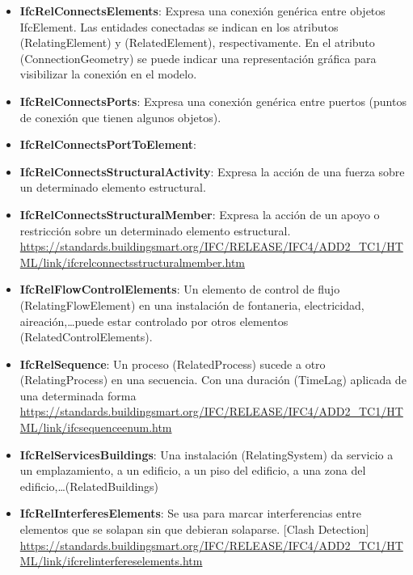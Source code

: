 \documentclass[spanish,12pt,a4paper,final,oneside]{book}
\begin{document}
\begin{itemize}
\item \textbf{IfcRelConnectsElements}: Expresa una conexión genérica entre objetos IfcElement. Las entidades conectadas se indican en los atributos (RelatingElement) y (RelatedElement), respectivamente. En el atributo (ConnectionGeometry) se puede indicar una representación gráfica para visibilizar la conexión en el modelo.

\item \textbf{IfcRelConnectsPorts}: Expresa una conexión genérica entre puertos (puntos de conexión que tienen algunos objetos).

\item \textbf{IfcRelConnectsPortToElement}:

\item \textbf{IfcRelConnectsStructuralActivity}: Expresa la acción de una fuerza sobre un determinado elemento estructural.

\item \textbf{IfcRelConnectsStructuralMember}: Expresa la acción de un apoyo o restricción sobre un determinado elemento estructural.
\\ \url{https://standards.buildingsmart.org/IFC/RELEASE/IFC4/ADD2_TC1/HTML/link/ifcrelconnectsstructuralmember.htm}

\item \textbf{IfcRelFlowControlElements}: Un elemento de control de flujo (RelatingFlowElement) en una instalación de fontaneria, electricidad, aireación,\ldots puede estar controlado por otros elementos (RelatedControlElements).

\item \textbf{IfcRelSequence}: Un proceso (RelatedProcess) sucede a otro (RelatingProcess) en una secuencia. Con una duración (TimeLag) aplicada de una determinada forma \url{https://standards.buildingsmart.org/IFC/RELEASE/IFC4/ADD2_TC1/HTML/link/ifcsequenceenum.htm}

\item \textbf{IfcRelServicesBuildings}: Una instalación (RelatingSystem) da servicio a un emplazamiento, a un edificio, a un piso del edificio, a una zona del edificio,\ldots (RelatedBuildings)

\item \textbf{IfcRelInterferesElements}: Se usa para marcar interferencias entre elementos que se solapan sin que debieran solaparse. [Clash Detection]
\\ \url{https://standards.buildingsmart.org/IFC/RELEASE/IFC4/ADD2_TC1/HTML/link/ifcrelinterfereselements.htm}

\end{itemize}
\end{document}
